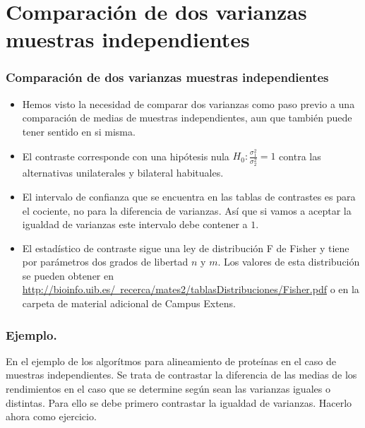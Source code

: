 \section{Comparación de dos varianzas muestras independientes}
\begin{frame}
\frametitle{Comparación de dos varianzas muestras independientes}
\begin{itemize}
\item Hemos visto la necesidad de comparar dos varianzas como paso previo a una comparación de medias de muestras independientes, aun que también puede tener sentido en si misma.
\item 
El contraste corresponde  con una hipótesis nula $H_0: \frac{\sigma^2_1}{\sigma_2^2}=1$ contra las alternativas unilaterales y bilateral habituales.
\item  El intervalo de confianza que se  encuentra en las tablas de contrastes es para el cociente, no para la diferencia de varianzas. Así que si  vamos a aceptar la igualdad de varianzas este intervalo debe contener a $1$.
\item El estadístico de contraste sigue una ley de distribución F de Fisher y tiene por parámetros dos grados de libertad $n$ y $m$.
Los valores de esta distribución se pueden obtener en \href{tabla de la función de distribución de Fisher}{http://bioinfo.uib.es/~recerca/mates2/tablasDistribuciones/Fisher.pdf} o en la carpeta de material adicional de Campus Extens.
\end{itemize}
\end{frame}


\begin{frame}
\frametitle{Ejemplo.}
En el ejemplo de los algorítmos para alineamiento de proteínas en el caso de muestras independientes. Se trata de contrastar la diferencia de las medias de los rendimientos en el caso que se determine según sean las varianzas iguales o distintas. Para ello se debe primero contrastar la igualdad de varianzas. Hacerlo ahora como ejercicio.
\end{frame}
